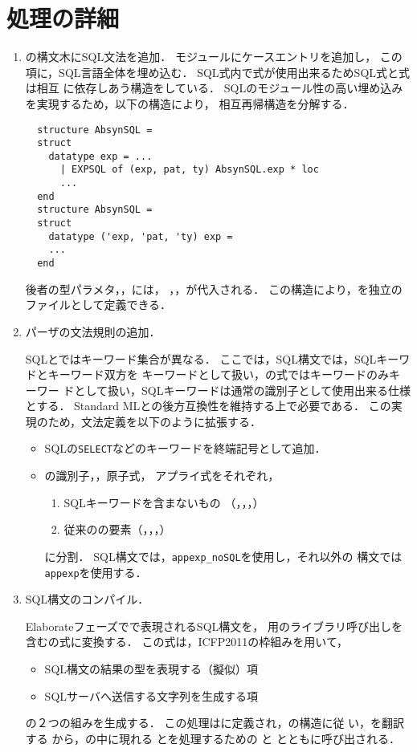 \section{処理の詳細}
\begin{enumerate}
\item \smlsharp{}の構文木にSQL文法を追加．
	モジュールにケースエントリを追加し，
この項に，SQL言語全体を埋め込む．
	SQL式内で\smlsharp{}式が使用出来るためSQL式と\smlsharp{}式は相互
に依存しあう構造をしている．
	SQLのモジュール性の高い埋め込みを実現するため，以下の構造により，
相互再帰構造を分解する．
\begin{verbatim}
  structure AbsynSQL = 
  struct
    datatype exp = ...
      | EXPSQL of (exp, pat, ty) AbsynSQL.exp * loc
      ...
  end
  structure AbsynSQL =
  struct
    datatype ('exp, 'pat, 'ty) exp =
    ...
  end
\end{verbatim}
	後者の型パラメタ，，には，
，，が代入される．
	この構造により，を独立のファイルとして定義できる．
\item パーザの文法規則の追加．

	SQLと\smlsharp{}ではキーワード集合が異なる．
	ここでは，SQL構文では，SQLキーワドと\smlsharp{}キーワード双方を
キーワードとして扱い，\smlsharp{}の式では\smlsharp{}キーワードのみキーワー
ドとして扱い，SQLキーワードは通常の識別子として使用出来る仕様とする．
	Standard MLとの後方互換性を維持する上で必要である．
	この実現のため，文法定義を以下のように拡張する．
\begin{itemize}
\item SQLの{\tt SELECT}などのキーワードを終端記号として追加．
\item \smlsharp{}の識別子，，原子式，
アプライ式をそれぞれ，
\begin{enumerate}
\item SQLキーワードを含まないもの
（，，，）
\item 従来の\smlsharp{}の要素（，，，）
\end{enumerate}
に分割．
	SQL構文では，{\tt appexp\_noSQL}を使用し，それ以外の\smlsharp{}
構文では{\tt appexp}を使用する．
\end{itemize}
\item SQL構文のコンパイル．

	Elaborateフェーズでで表現されるSQL構文を，
用のライブラリ呼び出しを含む\smlsharp{}の式に変換する．
	この式は，ICFP2011の枠組みを用いて，
\begin{itemize}
\item SQL構文の結果の型を表現する（擬似）項
\item SQLサーバへ送信する文字列を生成する項
\end{itemize}
の２つの組みを生成する．
	この処理はに定義され，の構造に従
い，を翻訳する
から，の中に現れる
とを処理するための
と
とともに呼び出される．


\end{enumerate}
